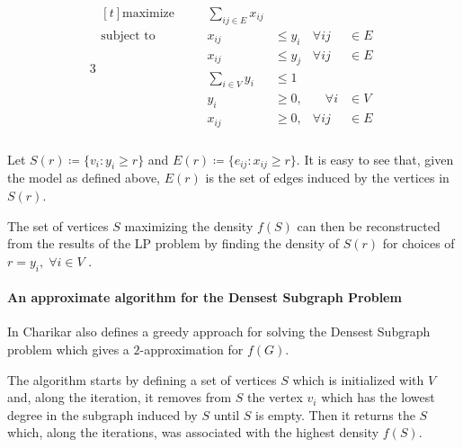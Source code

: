 \begin{alignat}{3}
	\label{eq:standard-form}
	\begin{aligned}[t]
		\text{maximize}   &       & \sum_{ij \in E} x_{ij}                 \\
		\text{subject to} & \quad & x_{ij}                  & \leq y_{i} &
		\forall ij        & \in E                                          \\
		                  &       & x_{ij}                  & \leq y_{j} &
		\forall ij        & \in E                                          \\
		                  &       & \sum^{}_{i \in V} y_{i} & \leq 1     & \\
		                  &       & y_{i}                   & \geq 0,    &
		\quad \forall i   & \in V                                          \\
		                  &       & x_{ij}                  & \geq 0,    &
		\forall ij        & \in E                                          \\
	\end{aligned}
\end{alignat}

Let $S(r) \coloneqq \{v_{i} : y_{i} \geq r\} $ and $E(r) \coloneqq \{e_{ij} :
	x_{ij} \geq r\} $. It is easy to see that, given the model as defined
above, $E(r)$ is the set of edges induced by the vertices in $S(r)$.

The set of vertices $S$ maximizing the density $f(S)$ can then be reconstructed
from the results of the \acrshort{LP} problem by finding the density of $S(r)$
for choices of $r = y_{i}, \; \forall i \in V $ \cite{charikar2000greedy}.

\paragraph{An approximate algorithm for the Densest Subgraph Problem}%
\label{par:an_approximate_algorithm_for_the_densest_subgraph_problem}

In \cite{charikar2000greedy} Charikar also defines a greedy approach for
solving the Densest Subgraph problem which gives a $2$-approximation for
$f(G)$.

The algorithm starts by defining a set of vertices $S$ which is initialized
with $V$ and, along the iteration, it removes from $S$ the vertex $v_i$ which
has the lowest degree in the subgraph induced by $S$ until $S$ is empty. Then
it returns the $S$ which, along the iterations, was associated with the highest
density $f(S)$.



